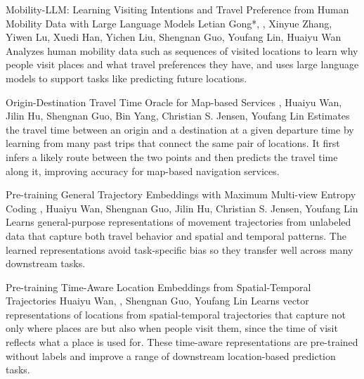 {Mobility-LLM: Learning Visiting Intentions and Travel Preference from Human Mobility Data with Large Language Models}
{Letian Gong*, \me*, Xinyue Zhang, Yiwen Lu, Xuedi Han, Yichen Liu, Shengnan Guo, Youfang Lin, Huaiyu Wan}
{Analyzes human mobility data such as sequences of visited locations to learn why people visit places and what travel preferences they have, and uses large language models to support tasks like predicting future locations.}

{Origin-Destination Travel Time Oracle for Map-based Services}
{\me, Huaiyu Wan, Jilin Hu, Shengnan Guo, Bin Yang, Christian S. Jensen, Youfang Lin}
{Estimates the travel time between an origin and a destination at a given departure time by learning from many past trips that connect the same pair of locations. It first infers a likely route between the two points and then predicts the travel time along it, improving accuracy for map-based navigation services.}

{Pre-training General Trajectory Embeddings with Maximum Multi-view Entropy Coding}
{\me, Huaiyu Wan, Shengnan Guo, Jilin Hu, Christian S. Jensen, Youfang Lin}
{Learns general-purpose representations of movement trajectories from unlabeled data that capture both travel behavior and spatial and temporal patterns. The learned representations avoid task-specific bias so they transfer well across many downstream tasks.}

{Pre-training Time-Aware Location Embeddings from Spatial-Temporal Trajectories}
{Huaiyu Wan, \me, Shengnan Guo, Youfang Lin}
{Learns vector representations of locations from spatial-temporal trajectories that capture not only where places are but also when people visit them, since the time of visit reflects what a place is used for. These time-aware representations are pre-trained without labels and improve a range of downstream location-based prediction tasks.}

